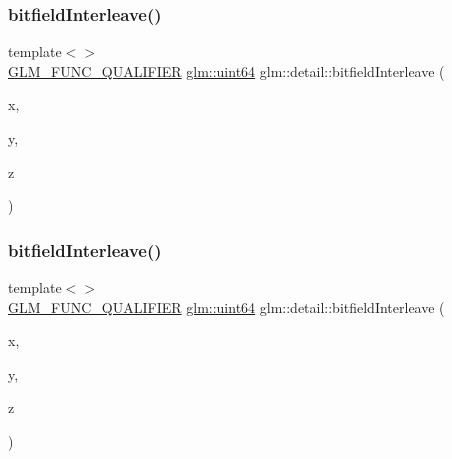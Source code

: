 \mbox{\label{namespaceglm_1_1detail_aceed48a30e6dc4f2c64945a60369d73d}} 
\subsubsection{\texorpdfstring{bitfield\+Interleave()}{bitfieldInterleave()}\hspace{0.1cm}{\footnotesize\ttfamily [8/11]}}
{\footnotesize\ttfamily template$<$$>$ \\
\hyperlink{setup_8hpp_a33fdea6f91c5f834105f7415e2a64407}{G\+L\+M\+\_\+\+F\+U\+N\+C\+\_\+\+Q\+U\+A\+L\+I\+F\+I\+ER} \hyperlink{group__gtc__type__precision_gae3632bf9b37da66233d78930dd06378a}{glm\+::uint64} glm\+::detail\+::bitfield\+Interleave (\begin{DoxyParamCaption}\item[{\hyperlink{group__gtc__type__precision_gad8c2939e1fdd8e5828b31d95c52255d5}{glm\+::uint16}}]{x,  }\item[{\hyperlink{group__gtc__type__precision_gad8c2939e1fdd8e5828b31d95c52255d5}{glm\+::uint16}}]{y,  }\item[{\hyperlink{group__gtc__type__precision_gad8c2939e1fdd8e5828b31d95c52255d5}{glm\+::uint16}}]{z }\end{DoxyParamCaption})}

\mbox{\label{namespaceglm_1_1detail_a7f6421e0b1180ec986fd91d8eb2d1cc9}} 
\subsubsection{\texorpdfstring{bitfield\+Interleave()}{bitfieldInterleave()}\hspace{0.1cm}{\footnotesize\ttfamily [9/11]}}
{\footnotesize\ttfamily template$<$$>$ \\
\hyperlink{setup_8hpp_a33fdea6f91c5f834105f7415e2a64407}{G\+L\+M\+\_\+\+F\+U\+N\+C\+\_\+\+Q\+U\+A\+L\+I\+F\+I\+ER} \hyperlink{group__gtc__type__precision_gae3632bf9b37da66233d78930dd06378a}{glm\+::uint64} glm\+::detail\+::bitfield\+Interleave (\begin{DoxyParamCaption}\item[{\hyperlink{group__gtc__type__precision_ga202b6a53c105fcb7e531f9b443518451}{glm\+::uint32}}]{x,  }\item[{\hyperlink{group__gtc__type__precision_ga202b6a53c105fcb7e531f9b443518451}{glm\+::uint32}}]{y,  }\item[{\hyperlink{group__gtc__type__precision_ga202b6a53c105fcb7e531f9b443518451}{glm\+::uint32}}]{z }\end{DoxyParamCaption})}

